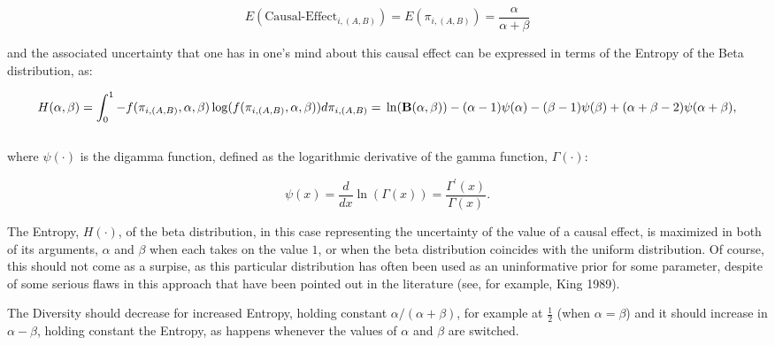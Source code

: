 \documentclass[11pt]{article}
\begin{document}
$$E(\text{Causal-Effect}_{i, (A, B)}) = E(\pi_{i, (A, B)})=\frac{\alpha}{\alpha + \beta}$$

and the associated uncertainty that one has in one's mind about this causal effect can be expressed in terms of the Entropy of the Beta distribution, as:

\begin{equation} \label{eq: entropy}
H(\alpha, \beta)=\int_0^1 -f(\pi_{i, (A, B)}, \alpha, \beta)\log(f(\pi_{i, (A, B)}, \alpha, \beta))d\pi_{i, (A, B)}=\\

\ln(\textbf{B}(\alpha, \beta))-(\alpha-1)\psi(\alpha)-(\beta-1)\psi(\beta)+(\alpha+\beta-2)\psi(\alpha+\beta),
\end{equation}\\


where $\psi(\cdot)$ is the digamma function, defined as the logarithmic derivative of the gamma function, $\Gamma(\cdot)$:

\begin{equation}
\psi(x)=\frac{d}{dx}\ln(\Gamma(x))=\frac{\Gamma^{'}(x)}{\Gamma(x)}.
\end{equation}

The Entropy, $H(\cdot)$, of the beta distribution, in this case representing the uncertainty of the value of a causal effect, is maximized in both of its arguments, $\alpha$ and $\beta$ when each takes on the value $1$, or when the beta distribution coincides with the uniform distribution. Of course, this should not come as a surpise, as this particular distribution has often been used as an uninformative prior for some parameter, despite of some serious flaws in this approach that have been pointed out in the literature (see, for example, King 1989).

The Diversity should decrease for increased Entropy, holding constant $\alpha/(\alpha + \beta)$, for example at $\frac{1}{2}$ (when $\alpha =\beta$) and it should increase in $\alpha-\beta$, holding constant the Entropy, as happens whenever the values of $\alpha$ and $\beta$ are switched.
\end{document}
